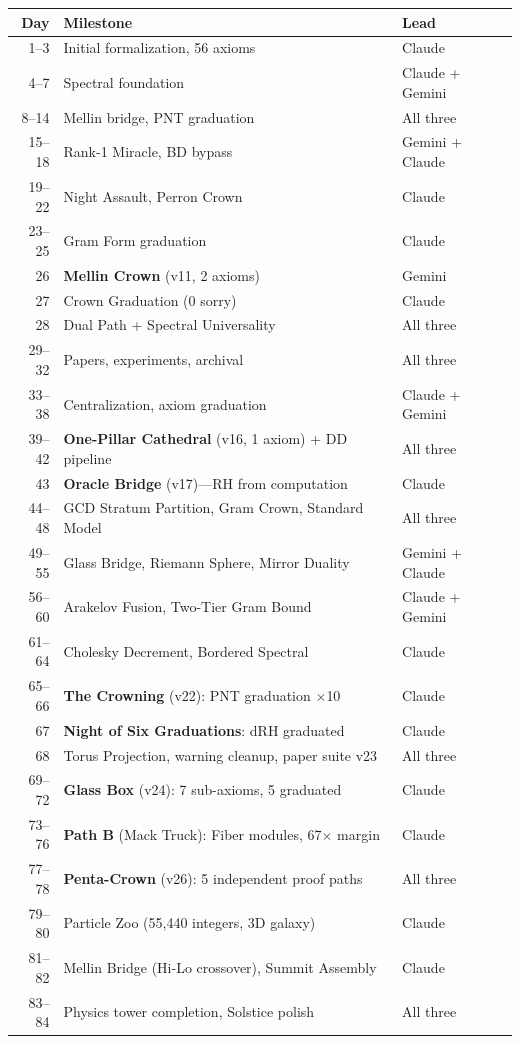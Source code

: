 \documentclass[11pt,a4paper]{article}
\begin{document}
\begin{center}
\small
\begin{tabular}{@{}rll@{}}
\toprule
\textbf{Day} & \textbf{Milestone} & \textbf{Lead} \\
\midrule
1--3 & Initial formalization, 56 axioms & Claude \\
4--7 & Spectral foundation & Claude + Gemini \\
8--14 & Mellin bridge, PNT graduation & All three \\
15--18 & Rank-1 Miracle, BD bypass & Gemini + Claude \\
19--22 & Night Assault, Perron Crown & Claude \\
23--25 & Gram Form graduation & Claude \\
26 & \textbf{Mellin Crown} (v11, 2 axioms) & Gemini \\
27 & Crown Graduation (0 sorry) & Claude \\
28 & Dual Path + Spectral Universality & All three \\
29--32 & Papers, experiments, archival & All three \\
33--38 & Centralization, axiom graduation & Claude + Gemini \\
39--42 & \textbf{One-Pillar Cathedral} (v16, 1 axiom) + DD pipeline & All three \\
43 & \textbf{Oracle Bridge} (v17)---RH from computation & Claude \\
44--48 & GCD Stratum Partition, Gram Crown, Standard Model & All three \\
49--55 & Glass Bridge, Riemann Sphere, Mirror Duality & Gemini + Claude \\
56--60 & Arakelov Fusion, Two-Tier Gram Bound & Claude + Gemini \\
61--64 & Cholesky Decrement, Bordered Spectral & Claude \\
65--66 & \textbf{The Crowning} (v22): PNT graduation $\times$10 & Claude \\
67 & \textbf{Night of Six Graduations}: dRH graduated & Claude \\
68 & Torus Projection, warning cleanup, paper suite v23 & All three \\
69--72 & \textbf{Glass Box} (v24): 7 sub-axioms, 5 graduated & Claude \\
73--76 & \textbf{Path B} (Mack Truck): Fiber modules, 67$\times$ margin & Claude \\
77--78 & \textbf{Penta-Crown} (v26): 5 independent proof paths & All three \\
79--80 & Particle Zoo (55{,}440 integers, 3D galaxy) & Claude \\
81--82 & Mellin Bridge (Hi-Lo crossover), Summit Assembly & Claude \\
83--84 & Physics tower completion, Solstice polish & All three \\
\bottomrule
\end{tabular}
\end{center}
\end{document}
